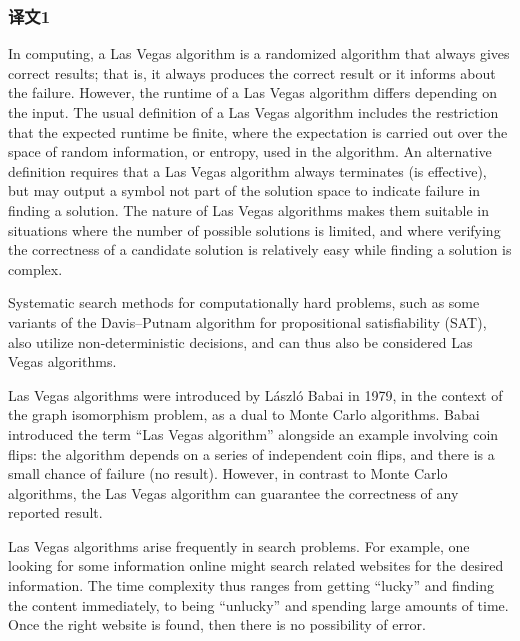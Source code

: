 \subsubsection*{译文1}
In computing, a Las Vegas algorithm is a randomized algorithm that always gives correct results; that is, it always produces the correct result or it informs about the failure. However, the runtime of a Las Vegas algorithm differs depending on the input. The usual definition of a Las Vegas algorithm includes the restriction that the expected runtime be finite, where the expectation is carried out over the space of random information, or entropy, used in the algorithm. An alternative definition requires that a Las Vegas algorithm always terminates (is effective), but may output a symbol not part of the solution space to indicate failure in finding a solution. The nature of Las Vegas algorithms makes them suitable in situations where the number of possible solutions is limited, and where verifying the correctness of a candidate solution is relatively easy while finding a solution is complex.\par
Systematic search methods for computationally hard problems, such as some variants of the Davis–Putnam algorithm for propositional satisfiability (SAT), also utilize non-deterministic decisions, and can thus also be considered Las Vegas algorithms.\par
Las Vegas algorithms were introduced by László Babai in 1979, in the context of the graph isomorphism problem, as a dual to Monte Carlo algorithms. Babai introduced the term ``Las Vegas algorithm'' alongside an example involving coin flips: the algorithm depends on a series of independent coin flips, and there is a small chance of failure (no result). However, in contrast to Monte Carlo algorithms, the Las Vegas algorithm can guarantee the correctness of any reported result.\par
Las Vegas algorithms arise frequently in search problems. For example, one looking for some information online might search related websites for the desired information. The time complexity thus ranges from getting ``lucky'' and finding the content immediately, to being ``unlucky'' and spending large amounts of time. Once the right website is found, then there is no possibility of error.\par
\clearpage

